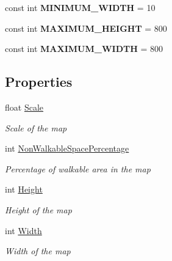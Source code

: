 \begin{DoxyCompactItemize}
\item 
\hypertarget{class_hel_project_1_1_game_world_1_1_map_1_1_h_map_ada746a4e165978121a6f3a85ae25c3ac}{}const int {\bfseries M\+I\+N\+I\+M\+U\+M\+\_\+\+W\+I\+D\+T\+H} = 10\label{class_hel_project_1_1_game_world_1_1_map_1_1_h_map_ada746a4e165978121a6f3a85ae25c3ac}

\item 
\hypertarget{class_hel_project_1_1_game_world_1_1_map_1_1_h_map_a48a95218ab4ed143b49f0cc510d7e43b}{}const int {\bfseries M\+A\+X\+I\+M\+U\+M\+\_\+\+H\+E\+I\+G\+H\+T} = 800\label{class_hel_project_1_1_game_world_1_1_map_1_1_h_map_a48a95218ab4ed143b49f0cc510d7e43b}

\item 
\hypertarget{class_hel_project_1_1_game_world_1_1_map_1_1_h_map_a312da821aed5e9718bc07f68494834a8}{}const int {\bfseries M\+A\+X\+I\+M\+U\+M\+\_\+\+W\+I\+D\+T\+H} = 800\label{class_hel_project_1_1_game_world_1_1_map_1_1_h_map_a312da821aed5e9718bc07f68494834a8}

\end{DoxyCompactItemize}
\subsection*{Properties}
\begin{DoxyCompactItemize}
\item 
float \hyperlink{class_hel_project_1_1_game_world_1_1_map_1_1_h_map_a023973ffc8b857d992378e235632021c}{Scale}
\begin{DoxyCompactList}\small\item\em Scale of the map \end{DoxyCompactList}\item 
int \hyperlink{class_hel_project_1_1_game_world_1_1_map_1_1_h_map_aa4a0c49d61c84b21d2a40745843b20df}{Non\+Walkable\+Space\+Percentage}
\begin{DoxyCompactList}\small\item\em Percentage of walkable area in the map \end{DoxyCompactList}\item 
int \hyperlink{class_hel_project_1_1_game_world_1_1_map_1_1_h_map_aeb6bb95a8fa7aebc3aaacc656ec70a76}{Height}
\begin{DoxyCompactList}\small\item\em Height of the map \end{DoxyCompactList}\item 
int \hyperlink{class_hel_project_1_1_game_world_1_1_map_1_1_h_map_aeb3db69a653089c32c2b61c7612bd106}{Width}
\begin{DoxyCompactList}\small\item\em Width of the map \end{DoxyCompactList}\end{DoxyCompactItemize}



